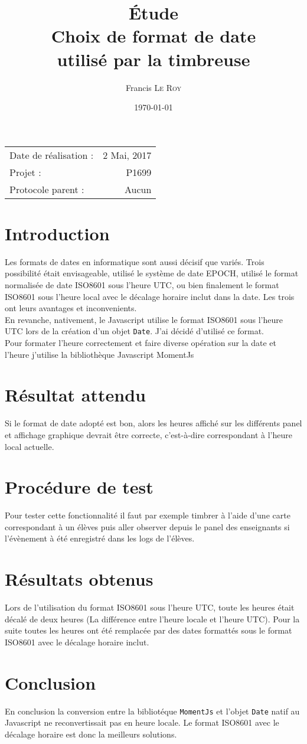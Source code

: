 \documentclass[10pt,a4paper,onecolumn]{article}
\title{Étude \\ Choix de format de date \\ utilisé par la timbreuse}
\author{Francis \textsc{Le Roy}}
\date{\today}
\begin{document}
\maketitle
\thispagestyle{fancy}

\begin{center}
\begin{tabular}{l r}
Date de réalisation : & 2 Mai, 2017 \\
Projet : & P1699 \\
Protocole parent : & Aucun
\end{tabular}
\end{center}

\section{Introduction}
Les formats de dates en informatique sont aussi décisif que variés. Trois possibilité était envisageable, utilisé le système de date EPOCH, utilisé le format normalisée de date ISO8601 \cite{isodate} sous l'heure UTC, ou bien finalement le format ISO8601 sous l'heure local avec le décalage horaire inclut dans la date. Les trois ont leurs avantages et inconvenients. \\
En revanche, nativement, le Javascript utilise le format ISO8601 sous l'heure UTC lors de la création d'un objet \texttt{Date}. J'ai décidé d'utilisé ce format. \\
Pour formater l'heure correctement et faire diverse opération sur la date et l'heure j'utilise la bibliothèque Javascript MomentJs \cite{momentjs}
\section{Résultat attendu}
Si le format de date adopté est bon, alors les heures affiché sur les différents panel et affichage graphique devrait être correcte, c'est-à-dire correspondant à l'heure local actuelle.
\section{Procédure de test}
Pour tester cette fonctionnalité il faut par exemple timbrer à l'aide d'une carte correspondant à un élèves puis aller observer depuis le panel des enseignants si l'évènement à été enregistré dans les logs de l'élèves.
\section{Résultats obtenus}
Lors de l'utilisation du format ISO8601 sous l'heure UTC, toute les heures était décalé de deux heures (La différence entre l'heure locale et l'heure UTC). Pour la suite toutes les heures ont été remplacée par des dates formattés sous le format ISO8601 avec le décalage horaire inclut.
\section{Conclusion}
En conclusion la conversion entre la bibliotéque \texttt{MomentJs} et l'objet \texttt{Date} natif au Javascript ne reconvertissait pas en heure locale. Le format ISO8601 avec le décalage horaire est donc la meilleurs solutions.

\printbibliography
\end{document}
